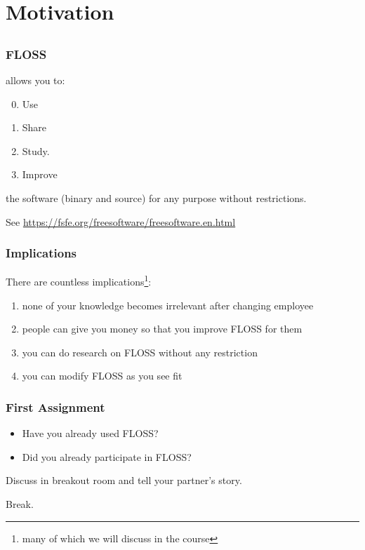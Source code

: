 \section{Motivation}
\subsection{}
\begin{frame}
	\frametitle{FLOSS}
	\floss{} allows you to:
	\begin{enumerate}
		\setcounter{enumi}{-1}
		\item Use
		\item Share
		\item Study.
		\item Improve
	\end{enumerate}
	the software (binary and source) for any purpose without restrictions.

	See \url{https://fsfe.org/freesoftware/freesoftware.en.html}
\end{frame}

\begin{frame}
	\frametitle{Implications}

	There are countless implications\footnote{many of which we will discuss in the course}:
	\begin{enumerate}
		\item none of your knowledge becomes irrelevant after changing employee
		\item people can give you money so that you improve FLOSS for them
		\item you can do research on FLOSS without any restriction
		\item you can modify FLOSS as you see fit
	\end{enumerate}
\end{frame}

\begin{assignment}
	\frametitle{First Assignment}
	\begin{itemize}
		\item Have you already used FLOSS?
		\item Did you already participate in FLOSS?
	\end{itemize}
	\begin{task}
	Discuss in breakout room and tell your partner's story.
	\end{task}
\end{assignment}

\begin{assignment}
	\begin{task}
	Break.
	\end{task}
\end{assignment}

